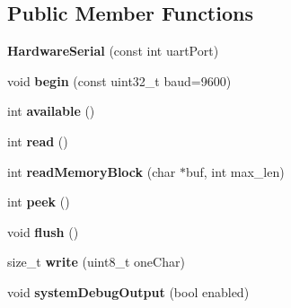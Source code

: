 \subsection*{Public Member Functions}
\begin{DoxyCompactItemize}
\item 
\hypertarget{class_hardware_serial_a3227f49b50f3f6a0d3e1c7641e82697b}{}{\bfseries Hardware\+Serial} (const int uart\+Port)\label{class_hardware_serial_a3227f49b50f3f6a0d3e1c7641e82697b}

\item 
\hypertarget{class_hardware_serial_ad10f3f07a59e390851b4ed47b8991d39}{}void {\bfseries begin} (const uint32\+\_\+t baud=9600)\label{class_hardware_serial_ad10f3f07a59e390851b4ed47b8991d39}

\item 
\hypertarget{class_hardware_serial_a609a8c9b978ce60334e93afc8625a91e}{}int {\bfseries available} ()\label{class_hardware_serial_a609a8c9b978ce60334e93afc8625a91e}

\item 
\hypertarget{class_hardware_serial_a3a60d321a0c62fa16a4e41dffe7e0242}{}int {\bfseries read} ()\label{class_hardware_serial_a3a60d321a0c62fa16a4e41dffe7e0242}

\item 
\hypertarget{class_hardware_serial_a7a340ec4cf7c689e95964b58c5bbc7c3}{}int {\bfseries read\+Memory\+Block} (char $\ast$buf, int max\+\_\+len)\label{class_hardware_serial_a7a340ec4cf7c689e95964b58c5bbc7c3}

\item 
\hypertarget{class_hardware_serial_a7acdf929737d21dc2ea9000d478d1fbb}{}int {\bfseries peek} ()\label{class_hardware_serial_a7acdf929737d21dc2ea9000d478d1fbb}

\item 
\hypertarget{class_hardware_serial_af12cc7f03315df841905003d728d9b87}{}void {\bfseries flush} ()\label{class_hardware_serial_af12cc7f03315df841905003d728d9b87}

\item 
\hypertarget{class_hardware_serial_a0115a99310d2c24205fdc13d692ad4be}{}size\+\_\+t {\bfseries write} (uint8\+\_\+t one\+Char)\label{class_hardware_serial_a0115a99310d2c24205fdc13d692ad4be}

\item 
\hypertarget{class_hardware_serial_a1365b152178ff99287c1e700b593a0e0}{}void {\bfseries system\+Debug\+Output} (bool enabled)\label{class_hardware_serial_a1365b152178ff99287c1e700b593a0e0}

\end{DoxyCompactItemize}
